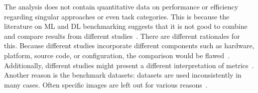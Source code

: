 The analysis does not contain quantitative data on performance or efficiency regarding
singular approaches or even task categories.
This is because the literature on \ac{ML} and \ac{DL} benchmarking suggests that it is not good
to combine and compare results from different
studies~\citep{baek_what_2019,arpteg_software_2018,long_scene_2021}.
There are different rationales for this.
Because different studies incorporate different components such as hardware, platform, source code,
or configuration, the comparison would be flawed~\citep{arpteg_software_2018,baek_what_2019}.
Additionally, different studies might present a different interpretation of
metrics~\citep{long_scene_2021}.
Another reason is the benchmark datasets: datasets are used inconsistently in
many cases.
Often specific images are left out for various reasons~\citep{baek_what_2019}.
